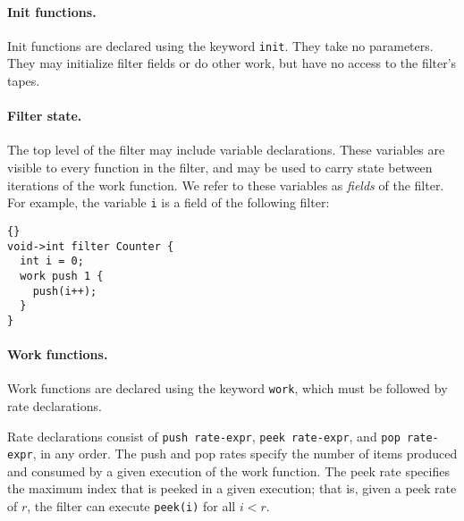 \documentclass[11pt]{article}
\begin{document}


\paragraph{Init functions.}  Init functions are declared using the
keyword \lstinline|init|.  They take no parameters.  They may initialize
filter fields or do other work, but have no access to the filter's
tapes.

\paragraph{Filter state.}  The top level of the filter may include
variable declarations.  These variables are visible to every function
in the filter, and may be used to carry state between iterations of
the work function.  We refer to these variables as {\it fields}
of the filter.  For example, the variable \lstinline|i| is a field of
the following filter:
\begin{lstlisting}{}
void->int filter Counter {
  int i = 0;
  work push 1 {
    push(i++);
  }
}
\end{lstlisting}{}

\paragraph{Work functions.}  Work functions are declared using the
keyword \lstinline|work|, which must be followed by rate declarations.

Rate declarations consist of \lstinline|push rate-expr|,
\lstinline|peek rate-expr|, and \lstinline|pop rate-expr|,
in any order.  The push and pop rates specify the number of items
produced and consumed by a given execution of the work function.  The
peek rate specifies the maximum index that is peeked in a given
execution; that is, given a peek rate of $r$, the filter can execute
\lstinline|peek(i)| for all $i < r$.
\end{document}
